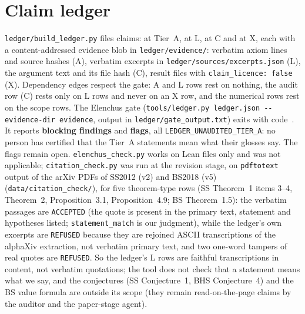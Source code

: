 \documentclass[10pt]{article}
\begin{document}
\section{Claim ledger}\label{sec:ledger}
\texttt{ledger/build\_ledger.py} files \SSALedgerN{} claims: \SSALedgerA{} at Tier~A, \SSALedgerL{} at L, \SSALedgerC{} at C and \SSALedgerX{} at X, each with a content-addressed evidence blob in \texttt{ledger/evidence/}: verbatim axiom lines and source hashes (A), verbatim excerpts in \texttt{ledger/sources/excerpts.json} (L), the argument text and its file hash (C), result files with \texttt{claim\_licence: false} (X). Dependency edges respect the gate: A and L rows rest on nothing, the audit row (C) rests only on L rows and never on an X row, and the numerical rows rest on the scope rows.
The Elenchus gate (\texttt{tools/ledger.py ledger.json -{}-evidence-dir evidence}, output in \texttt{ledger/gate\_output.txt}) exits with code~\SSAGateExit. It reports \textbf{\SSAGateBlock{} blocking findings} and \textbf{\SSAGateFlag{} flags}, all \texttt{LEDGER\_UNAUDITED\_TIER\_A}: no person has certified that the Tier~A statements mean what their glosses say. The flags remain open. \texttt{elenchus\_check.py} works on Lean files only and was not applicable; \texttt{citation\_check.py} was run at the revision stage, on \texttt{pdftotext} output of the arXiv PDFs of SS2012 (v2) and BS2018 (v5) (\texttt{data/citation\_check/}), for five theorem-type rows (SS Theorem~1 items 3--4, Theorem~2, Proposition~3.1, Proposition~4.9; BS Theorem~1.5): the verbatim passages are \texttt{ACCEPTED} (the quote is present in the primary text, statement and hypotheses listed; \texttt{statement\_match} is our judgment), while the ledger's own excerpts are \texttt{REFUSED} because they are rejoined ASCII transcriptions of the alphaXiv extraction, not verbatim primary text, and two one-word tampers of real quotes are \texttt{REFUSED}. So the ledger's L rows are faithful transcriptions in content, not verbatim quotations; the tool does not check that a statement means what we say, and the conjectures (SS Conjecture~1, BHS Conjecture~4) and the BS value formula are outside its scope (they remain read-on-the-page claims by the auditor and the paper-stage agent).
\end{document}
